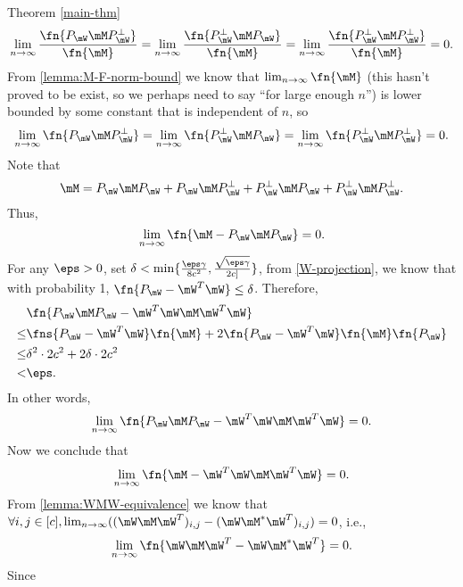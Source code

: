 \begin{proofof}{Theorem \cref{main-thm}}
\begin{equation}
    \lim_{n\to\infty}\frac{\fn{P_\mW\mM P_\mW^\perp}}{\fn{\mM }}=\lim_{n\to\infty}\frac{\fn{P_\mW^\perp \mM P_\mW}}{\fn{\mM }}=\lim_{n\to\infty}\frac{\fn{P_\mW^\perp \mM P_\mW^\perp}}{\fn{\mM }}=0.
\end{equation}
From \cref{lemma:M-F-norm-bound} we know that $\lim_{n\to\infty}\fn{\mM }$ (this hasn't proved to be exist, so we perhaps need to say ``for large enough $n$'') is lower bounded by some constant that is independent of $n$, so
\begin{equation}
    \lim_{n\to\infty}\fn{P_\mW\mM P_\mW^\perp} = \lim_{n\to\infty}\fn{P_\mW^\perp \mM P_\mW} = \lim_{n\to\infty}\fn{P_\mW^\perp \mM P_\mW^\perp} = 0.
\end{equation}
Note that
\begin{equation}
    \mM  = P_\mW\mM P_\mW + P_\mW\mM P_\mW^\perp + P_\mW^\perp \mM P_\mW + P_\mW^\perp \mM P_\mW^\perp.
\end{equation}
Thus,
\begin{equation}
    \lim_{n\to\infty}\fn{\mM -P_\mW\mM P_\mW}=0.
\end{equation}
For any $\eps>0$, set $\delta<\min\{\frac{\eps\gamma}{8c^2},\frac{\sqrt{\eps\gamma}}{2c]}\}$, from \cref{W-projection}, we know that with probability 1, $\fn{P_\mW-\mW^T\mW}\leq\delta$. Therefore,
\begin{equation}\begin{split}
    &\fn{P_\mW\mM P_\mW-\mW^T\mW\mM \mW^T\mW}\\ \leq& \fns{P_\mW-\mW^T\mW}\fn{\mM } + 2\fn{P_\mW-\mW^T\mW}\fn{\mM }\fn{P_\mW}\\
                           \leq& \delta^2\cdot 2c^2 + 2\delta\cdot 2c^2\\
                           <& \eps.
\end{split}\end{equation}
In other words, 
\begin{equation}
    \lim_{n\to\infty}\fn{P_\mW\mM P_\mW-\mW^T\mW\mM \mW^T\mW}=0.
\end{equation}
Now we conclude that
\begin{equation}
    \lim_{n\to\infty}\fn{\mM -\mW^T\mW\mM \mW^T\mW} = 0.
\end{equation}
From \cref{lemma:WMW-equivalence} we know that $\forall i,j\in[c], \lim_{n\to\infty}((\mW\mM\mW^T)_{i,j}-(\mW\mM^*\mW^T)_{i,j})=0$, i.e.,
\begin{equation}
    \lim_{n\to\infty}\fn{\mW\mM \mW^T-\mW\mM^*\mW^T}=0.
\end{equation}
Since

\end{proofof}
